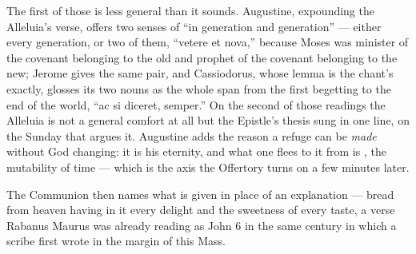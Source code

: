 The first of those is less general than it sounds. Augustine, expounding the
Alleluia's verse, offers two senses of ``in generation and generation'' ---
either every generation, or two of them, ``vetere et nova,'' because Moses was
minister of the covenant belonging to the old and prophet of the covenant
belonging to the new; Jerome gives the same pair, and Cassiodorus, whose lemma
is the chant's exactly, glosses its two nouns as the whole span from the first
begetting to the end of the world, ``ac si diceret, semper.'' On the second of
those readings the Alleluia is not a general comfort at all but the Epistle's
thesis sung in one line, on the Sunday that argues it. Augustine adds the
reason a refuge can be \emph{made} without God changing: it is his eternity,
and what one flees to it from is , the mutability
of time --- which is the axis the Offertory turns on a few minutes later.

The Communion then names what is given in place of an explanation --- bread
from heaven having in it every delight and the sweetness of every taste, a
verse Rabanus Maurus was already reading as John 6 in the same century in which
a scribe first wrote  in the margin of this Mass.
